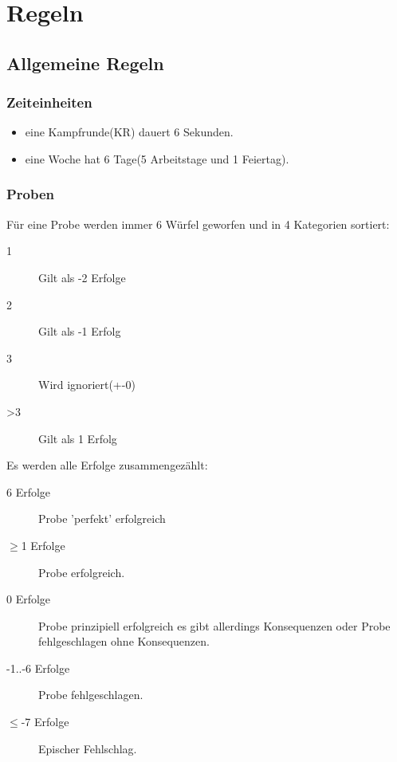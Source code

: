 \raggedright
\part{Regeln}
\chapter{Allgemeine Regeln}
\section{Zeiteinheiten}
\begin{itemize}
\item eine Kampfrunde(KR) dauert 6 Sekunden.
\item eine Woche hat 6 Tage(5 Arbeitstage und 1 Feiertag).
\end{itemize}

\section{Proben}
\label{AllgProben}

Für eine Probe werden immer 6 Würfel geworfen und in 4 Kategorien sortiert:
\begin{description}
\item[1] Gilt als -2 Erfolge
\item[2] Gilt als -1 Erfolg
\item[3] Wird ignoriert(+-0)
\item[>3] Gilt als 1 Erfolg
\end{description}
Es werden alle Erfolge zusammengezählt:
\begin{description}
\item[6 Erfolge] Probe 'perfekt' erfolgreich
\item[$\geq$1 Erfolge] Probe erfolgreich.
\item[0 Erfolge] Probe prinzipiell erfolgreich es gibt allerdings Konsequenzen oder Probe fehlgeschlagen ohne Konsequenzen.
\item[-1..-6 Erfolge] Probe fehlgeschlagen.
\item[$\leq$-7 Erfolge] Epischer Fehlschlag.
\end{description}

